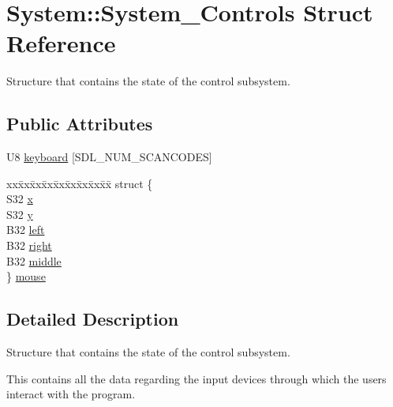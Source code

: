 \hypertarget{structSystem_1_1System__Controls}{}\section{System\+::System\+\_\+\+Controls Struct Reference}
\label{structSystem_1_1System__Controls}


Structure that contains the state of the control subsystem.  


\subsection*{Public Attributes}
\begin{DoxyCompactItemize}
\item 
U8 \mbox{\hyperlink{structSystem_1_1System__Controls_a6c9623aa1dac4ab25cc0a190bf9bb6e0}{keyboard}} \mbox{[}S\+D\+L\+\_\+\+N\+U\+M\+\_\+\+S\+C\+A\+N\+C\+O\+D\+ES\mbox{]}
\item 
\begin{tabbing}
xx\=xx\=xx\=xx\=xx\=xx\=xx\=xx\=xx\=\kill
struct \{\\
\>S32 \mbox{\hyperlink{structSystem_1_1System__Controls_a2b0baa944b0039ebccdca209f164dc0b}{x}}\\
\>S32 \mbox{\hyperlink{structSystem_1_1System__Controls_a10ceb04c7a87178af40e43cccf2d64c5}{y}}\\
\>B32 \mbox{\hyperlink{structSystem_1_1System__Controls_a82a1aae9c6bf3664438d89d41c497a40}{left}}\\
\>B32 \mbox{\hyperlink{structSystem_1_1System__Controls_aaf03eca483805c57b9db6eadfa408f1d}{right}}\\
\>B32 \mbox{\hyperlink{structSystem_1_1System__Controls_ae96987cd47d8ee72ab63d2f0951d24e4}{middle}}\\
\} \mbox{\hyperlink{structSystem_1_1System__Controls_aadf9a9517ce857ccb493f81d0721e479}{mouse}}\\

\end{tabbing}\end{DoxyCompactItemize}


\subsection{Detailed Description}
Structure that contains the state of the control subsystem. 

This contains all the data regarding the input devices through which the users interact with the program. 

